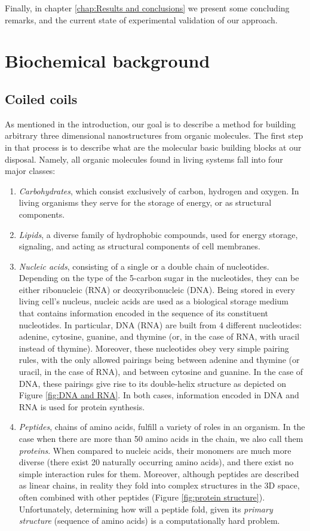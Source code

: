 \documentclass[12pt,a4paper,titlepage,openany]{report}
\begin{document}
Finally, in chapter \ref{chap:Results and conclusions} we present some concluding remarks, and the current state of experimental validation of our approach.

\chapter{Biochemical background}
\thispagestyle{fancy}

\section{Coiled coils}
As mentioned in the introduction, our goal is to describe a method for building arbitrary three dimensional nanostructures from organic molecules. The first step in that process is to describe what are the molecular basic building blocks at our disposal.
Namely, all organic molecules found in living systems fall into four major classes:
\begin{enumerate}
	\item \emph{Carbohydrates}, which consist exclusively of carbon, hydrogen and oxygen. In living organisms they serve for the storage of energy, or as structural components.
	\item \emph{Lipids}, a diverse family of hydrophobic compounds, used for energy storage, signaling, and acting as structural components of cell membranes.
	\item \emph{Nucleic acids}, consisting of a single or a double chain of nucleotides. Depending on the type of the 5-carbon sugar in the nucleotides, they can be either ribonucleic (RNA) or deoxyribonucleic (DNA). Being stored in every living cell's nucleus, nucleic acids are used as a biological storage medium that contains information encoded in the sequence of its constituent nucleotides. In particular, DNA (RNA) are built from 4 different nucleotides: adenine, cytosine, guanine, and thymine (or, in the case of  RNA, with uracil instead of thymine). Moreover, these nucleotides obey very simple pairing rules, with the only allowed pairings being between adenine and thymine (or uracil, in the case of RNA), and between cytosine and guanine. In the case of DNA, these pairings give rise to its double-helix structure as depicted on Figure \ref{fig:DNA and RNA}. In both cases, information encoded in DNA and RNA is used for protein synthesis.
	\item \emph{Peptides}, chains of amino acids, fulfill a variety of roles in an organism. In the case when there are more than 50 amino acids in the chain, we also call them \emph{proteins}. When compared to nucleic acids, their monomers are much more diverse (there exist 20 naturally occurring amino acids), and there exist no simple interaction rules for them. Moreover, although peptides are described as linear chains, in reality they fold into complex structures in the 3D space, often combined with other peptides (Figure \ref{fig:protein structure}). Unfortunately, determining how will a peptide fold, given its \emph{primary structure} (sequence of amino acids) is a computationally hard problem.
\end{enumerate} 
\end{document}
